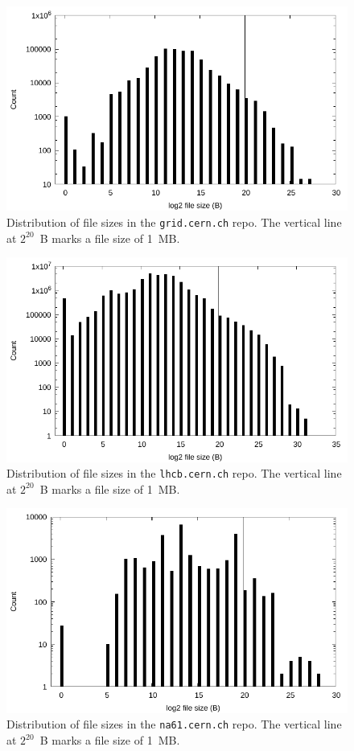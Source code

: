 \documentclass[conference]{IEEEtran}
\begin{document}
\begin{figure}
\includegraphics[width=\linewidth]{plots/file-hist/grid.pdf}
\caption{Distribution of file sizes in the \texttt{grid.cern.ch} repo.
The vertical line at $2^{20}$~B marks a file size of 1~MB.}
\end{figure}

\begin{figure}
\includegraphics[width=\linewidth]{plots/file-hist/lhcb.pdf}
\caption{Distribution of file sizes in the \texttt{lhcb.cern.ch} repo.
The vertical line at $2^{20}$~B marks a file size of 1~MB.}
\end{figure}

\begin{figure}
\includegraphics[width=\linewidth]{plots/file-hist/na61.pdf}
\caption{Distribution of file sizes in the \texttt{na61.cern.ch} repo.
The vertical line at $2^{20}$~B marks a file size of 1~MB.}
\end{figure}
\end{document}
